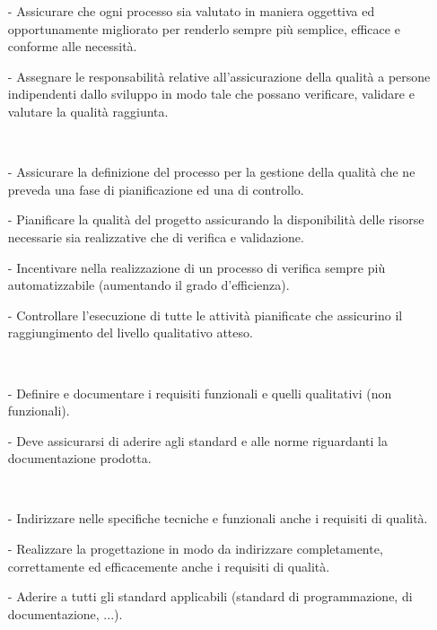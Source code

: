 \documentclass[a4paper, titlepage]{article}
\begin{document}
\begin{description}
		\item {}
		\begin{itemize}
			\item[-]Assicurare che ogni processo sia valutato in maniera oggettiva ed opportunamente migliorato per renderlo sempre più semplice, efficace e conforme alle necessità.
			\item[-]Assegnare le responsabilità relative all’assicurazione della qualità a persone indipendenti dallo sviluppo in modo tale che possano verificare, validare e valutare la qualità raggiunta.
		\end{itemize}
		\ 
		\item {}
		\begin{itemize}
			\item[-]Assicurare la definizione del processo per la gestione della qualità che ne preveda una fase di pianificazione ed una di controllo.
			\item[-]Pianificare la qualità del progetto assicurando la disponibilità delle risorse necessarie sia realizzative che di verifica e validazione.
			\item[-] Incentivare nella realizzazione di un processo di verifica sempre più automatizzabile (aumentando il grado d'efficienza).
			\item[-]Controllare l’esecuzione di tutte le attività pianificate che assicurino il raggiungimento del livello qualitativo atteso.
		\end{itemize}
		\ 
		\item {}
		\begin{itemize}
			\item[-] Definire e documentare i requisiti funzionali e quelli qualitativi (non funzionali).
			\item[-] Deve assicurarsi di aderire agli standard e alle norme riguardanti la documentazione prodotta.
		\end{itemize}
		\ 
		\item \bold{\italics{Progettista}}
		\begin{itemize}
			\item[-] Indirizzare nelle specifiche tecniche e funzionali anche i requisiti di qualità.
			\item[-] Realizzare la progettazione in modo da indirizzare completamente, correttamente ed efficacemente anche i requisiti di qualità.
			\item[-] Aderire a tutti gli standard applicabili (standard di programmazione, di documentazione, ...).

\end{itemize}
\end{description}
\end{document}
